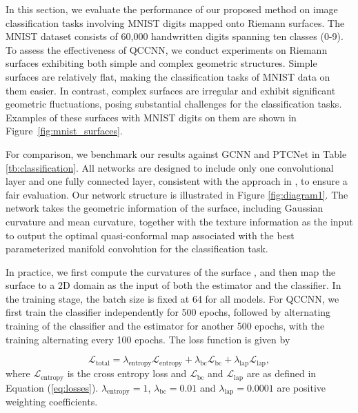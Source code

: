 In this section, we evaluate the performance of our proposed method on image classification tasks involving MNIST digits mapped onto Riemann surfaces. The MNIST dataset consists of 60,000 handwritten digits spanning ten classes (0-9). To assess the effectiveness of QCCNN, we conduct experiments on Riemann surfaces exhibiting both simple and complex geometric structures.
Simple surfaces are relatively flat, making the classification tasks of MNIST data on them easier. In contrast, complex surfaces are irregular and exhibit significant geometric fluctuations, posing substantial challenges for the classification tasks. Examples of these surfaces with MNIST digits on them are shown in Figure~\ref{fig:mnist_surfaces}. 

For comparison, we benchmark our results against GCNN and PTCNet in Table \ref{tb:classification}. All networks are designed to include only one convolutional layer and one fully connected layer, consistent with the approach in \cite{schonsheck2022parallel}, to ensure a fair evaluation. Our network structure is illustrated in Figure \ref{fig:diagram1}. The network takes the geometric information of the surface, including Gaussian curvature and mean curvature, together with the texture information as the input to output the optimal quasi-conformal map associated with the best parameterized manifold convolution for the classification task.

In practice, we first compute the curvatures of the surface \cite{Dastan2025}, and then map the surface to a 2D domain \cite{meng2016conformal} as the input of both the estimator and the classifier. In the training stage, the batch size is fixed at 64 for all models. For QCCNN, we first train the classifier independently for 500 epochs, followed by alternating training of the classifier and the estimator for another 500 epochs, with the training alternating every 100 epochs. The loss function is given by

\begin{equation}\label{loss_total}
    \mathcal{L}_\text{total} = \lambda_\text{entropy} \mathcal{L}_\text{entropy} + \lambda_\text{bc} \mathcal{L}_\text{bc} + \lambda_\text{lap} \mathcal{L}_\text{lap},
\end{equation}
where $\mathcal{L}_\text{entropy}$ is the cross entropy loss and $\mathcal{L}_\text{bc}$ and $\mathcal{L}_\text{lap}$ are as defined in Equation (\ref{eq:losses}). $\lambda_\text{entropy}=1$, $\lambda_\text{bc}=0.01$ and $\lambda_\text{lap}=0.0001$ are positive weighting coefficients.

